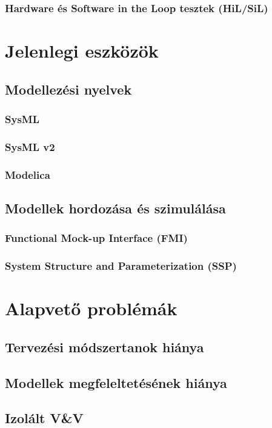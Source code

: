         \subsubsection{Hardware és Software in the Loop tesztek (HiL/SiL)}


\section{Jelenlegi eszközök}

    \subsection{Modellezési nyelvek}

        \subsubsection{SysML}

        \subsubsection{SysML v2}

        \subsubsection{Modelica}

    \subsection{Modellek hordozása és szimulálása}

        \subsubsection{Functional Mock-up Interface (FMI)}

        \subsubsection{System Structure and Parameterization (SSP)}

\section{Alapvető problémák}

    \subsection{Tervezési módszertanok hiánya}

    \subsection{Modellek megfeleltetésének hiánya}

    \subsection{Izolált V\&V}